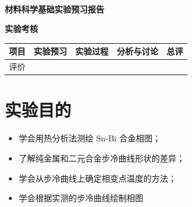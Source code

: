 \documentclass[a4paper,utf8]{article}
\begin{document}
\begin{center}
    {\mbox{}\\[7em]\bfseries\songti%
    材料科学基础实验预习报告}\\[34mm]
    {\bfseries\songti
    实验考核\\[3mm]
    \extrarowheight=3mm
    \begin{tabularx}{150mm}{|X|X|X|X|X|}\hline
        \hfil 项目 \hfil  & \hfil 实验预习 \hfil & \hfil 实验过程 \hfil & \hfil 分析与讨论 \hfil & \hfil 总评 \hfil \\[3mm] \hline
        \hfil 评价 \hfil &  &  &  &  \\[3mm] \hline
    \end{tabularx}
    }
\end{center}
\newpage
\section{实验目的}
    \begin{itemize}
        \item 学会用热分析法测绘 Sn-Bi 合金相图；
        \item 了解纯金属和二元合金步冷曲线形状的差异；
        \item 学会从步冷曲线上确定相变点温度的方法；
        \item 学会根据实测的步冷曲线绘制相图
    \end{itemize}
\end{document}
